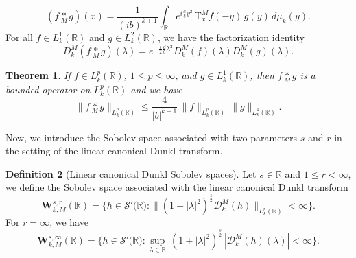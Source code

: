 \documentclass[12pt,a4paper,reqno]{amsproc}
\newtheorem{theorem}{Theorem}[section]
\theoremstyle{definition}
\newtheorem{definition}[theorem]{Definition}
\theoremstyle{remark}
\numberwithin{equation}{section}
\newcommand{\Tau}{\mathrm{T}}
\begin{document}
\begin{equation*}
(f \underset{M}{\ast} g)(x) =  \frac{1}{(ib)^{k+1}}\int_{\mathbb{R}}e^{i \frac{a}{b}y^2}\,\Tau^M_xf(-y)\,  g(y)  \,d\mu_{k}(y).
\end{equation*} 
For all $f \in L^1_{k}(\mathbb{R})$  and $g\in L^2_{k}(\mathbb{R})$, we have the factorization identity 
\begin{equation} \label{Prop:2.2.4}
D^M_k(f \underset{M}{\ast} g)(\lambda) = e^{-\frac{i}{2}\frac{d}{b}\lambda^2} D^M_{k}(f)(\lambda) D^M_{k}(g)(\lambda).
\end{equation} 
\begin{theorem} 
If  $f\in L_k^p(\mathbb{R})$, $1\le p \le \infty$, and $g\in L_k^1(\mathbb{R})$, then $f \underset{M}{\ast} g$  is a bounded operator on $L_k^p(\mathbb{R})$ and we have
\begin{equation*} 
 \| f \underset{M}{\ast} g\|_{L_k^p(\mathbb{R})}  \le
\frac {4}{ |b|^{k+1}}\,\|f\|_{L^{p}_{k} (\mathbb{R})}\,\|g\|_{L^{1}_{k} (\mathbb{R})}.
\end{equation*}
\end{theorem}
Now, we introduce the Sobolev space associated with two parameters $s$ and $r$ in the setting of the linear canonical Dunkl transform.
\begin{definition}[Linear canonical Dunkl Sobolev spaces] \label{C7-D2.2}
Let $s \in \mathbb{R}$ and $1\le r <\infty$, we define the Sobolev space associated with the linear canonical Dunkl transform
$${\textbf{W}^{s,r}_{k,M}(\mathbb{R})} = \{ h \in \mathcal{S' (\mathbb{R}}) : \|(1+|\lambda|^2)^{\frac{s}{2}} \mathcal{D}^M_k(h)\|_{L_k^r(\mathbb{R})} < \infty\}. $$
For $r=\infty$, we have 
$$\textbf{W}^{s,\infty}_{k,M}(\mathbb{R})= \{ h \in \mathcal{S' (\mathbb{R}}) : \sup_{\lambda\in \mathbb{R}} \,(1+|\lambda|^2)^{\frac{s}{2}}\, |\mathcal{D}^M_k(h)(\lambda)| < \infty\}.$$
\end{definition}
\end{document}
